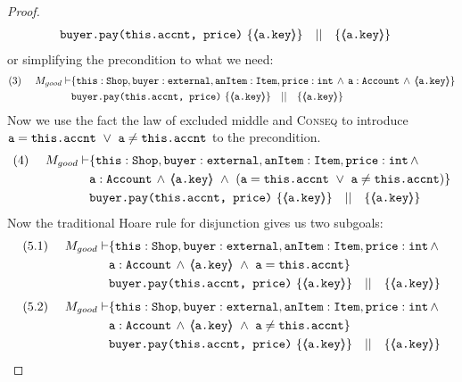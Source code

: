 \begin{proof}
\begin{align*}
		 & \prg{buyer.pay(this.accnt, price)} \ \{ \inside{\prg{a.key}} \} \ \ \  || \ \ \  \{ \inside{\prg{a.key}} \}
\end{align*}
\normalsize
or simplifying the precondition to what we need:
\small
\begin{align*}
\text{(3)} \ \ \ \ M_{good} \vdash & \{  \prg{this}:\prg{Shop}, \prg{buyer} : \prg{external}, \prg{anItem} : \prg{Item}, \prg{price} : \prg{int} \, \wedge\, 
		 \prg{a} : \prg{Account}\, \wedge\,  \inside{\prg{a.key}} \}  \\
		 & \prg{buyer.pay(this.accnt, price)} \ \{ \inside{\prg{a.key}} \} \ \ \  || \ \ \  \{ \inside{\prg{a.key}} \}
\end{align*}
\normalsize
Now we use the fact the law of excluded middle and \textsc{Conseq} to introduce $\mbox{\normalfont{\texttt{a}}} = \mbox{\normalfont{\texttt{this.accnt}}}\ \vee\ \mbox{\normalfont{\texttt{a}}} \not= \mbox{\normalfont{\texttt{this.accnt}}}$ to the precondition.
\small
\begin{align*}
\text{(4)} \ \ \ \ M_{good} \vdash & \{  \prg{this}:\prg{Shop}, \prg{buyer} : \prg{external}, \prg{anItem} : \prg{Item}, \prg{price} : \prg{int} \, \wedge\,  \\
		 &\prg{a} : \prg{Account}\, \wedge\,  \inside{\prg{a.key}}\ \wedge\ (\prg{a} = \prg{this.accnt}\ \vee\ \prg{a} \not= \prg{this.accnt}) \}  \\
		 & \prg{buyer.pay(this.accnt, price)} \ \{ \inside{\prg{a.key}} \} \ \ \  || \ \ \  \{ \inside{\prg{a.key}} \}
\end{align*}
\normalsize
Now the traditional  Hoare rule for disjunction gives us two subgoals:
\small
\begin{align*}
\text{(5.1)} \ \ \ \ M_{good} \vdash & \{  \prg{this}:\prg{Shop}, \prg{buyer} : \prg{external}, \prg{anItem} : \prg{Item}, \prg{price} : \prg{int} \, \wedge\,  \\
		 &\prg{a} : \prg{Account}\, \wedge\,  \inside{\prg{a.key}}\ \wedge\ \prg{a} = \prg{this.accnt} \}  \\
		 & \prg{buyer.pay(this.accnt, price)} \ \{ \inside{\prg{a.key}} \} \ \ \  || \ \ \  \{ \inside{\prg{a.key}} \}
\end{align*}
\normalsize
\small
\begin{align*}
\text{(5.2)} \ \ \ \ M_{good} \vdash & \{  \prg{this}:\prg{Shop}, \prg{buyer} : \prg{external}, \prg{anItem} : \prg{Item}, \prg{price} : \prg{int} \, \wedge\,  \\
		 &\prg{a} : \prg{Account}\, \wedge\,  \inside{\prg{a.key}}\ \wedge\ \prg{a} \not= \prg{this.accnt} \}  \\
		 & \prg{buyer.pay(this.accnt, price)} \ \{ \inside{\prg{a.key}} \} \ \ \  || \ \ \  \{ \inside{\prg{a.key}} \}

\end{align*}
\end{proof}
